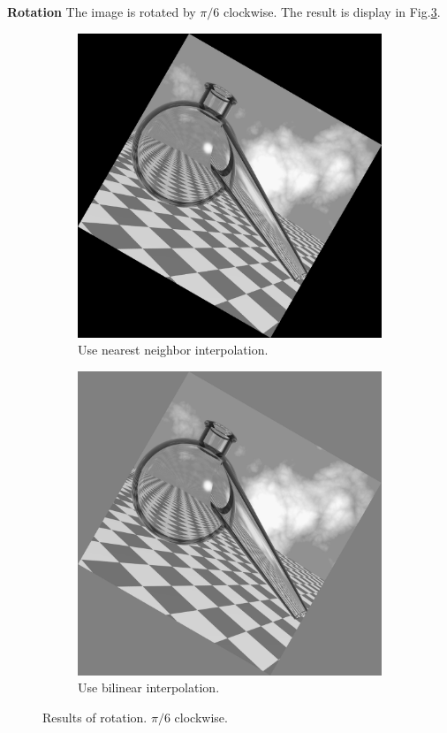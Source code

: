 \textbf{Rotation} The image is rotated by $\pi /6$ clockwise. The result is display in Fig.\ref{fig:rotate}. 
\begin{figure}[h!]
	\centering
	\begin{subfigure}[b]{0.45\linewidth}
		\includegraphics[width=\linewidth]{myfigure/p6/rotation_ne.png}
		\caption{Use nearest neighbor interpolation.}
		\label{fig:rotate_ne}
	\end{subfigure}
  	\begin{subfigure}[b]{0.45\linewidth}
		\includegraphics[width=\linewidth]{myfigure/p6/rotation_bi.png}
		\caption{Use bilinear interpolation.}
		\label{fig:rotate_b}
	\end{subfigure}
  	\caption{Results of rotation. $\pi/6$ clockwise.}
  	\label{fig:rotate}
\end{figure}


